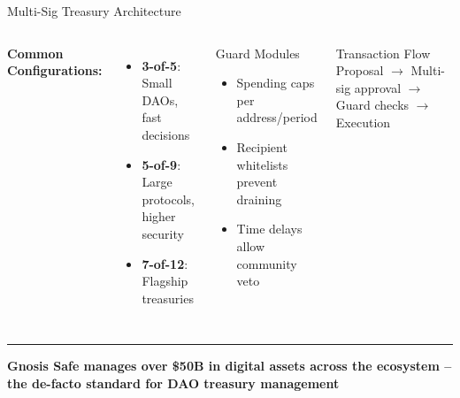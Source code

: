\documentclass[8pt,aspectratio=169]{beamer}
\newcommand{\bottomnote}[1]{\vfill\vspace{-2mm}\textcolor{mllavender2}{\rule{\textwidth}{0.4pt}}\vspace{1mm}\footnotesize\textbf{#1}}
\begin{document}
\begin{frame}{Multi-Sig Treasury Architecture}
\begin{columns}[T]
\vspace{2mm}
\textbf{\textcolor{mlpurple}{Common Configurations:}}
\begin{itemize}\setlength\itemsep{3pt}
  \item \textbf{3-of-5}: Small DAOs, fast decisions
  \item \textbf{5-of-9}: Large protocols, higher security
  \item \textbf{7-of-12}: Flagship treasuries
\end{itemize}
\vspace{4pt}
\begin{block}{Guard Modules}
\begin{itemize}\setlength\itemsep{2pt}
  \item Spending caps per address/period
  \item Recipient whitelists prevent draining
  \item Time delays allow community veto
\end{itemize}
\end{block}
\vspace{4pt}
\begin{block}{Transaction Flow}
\scriptsize
Proposal $\to$ Multi-sig approval $\to$ Guard checks $\to$ Execution
\end{block}
\end{columns}
\bottomnote{Gnosis Safe manages over \$50B in digital assets across the ecosystem -- the de-facto standard for DAO treasury management}
\end{frame}
\end{document}
